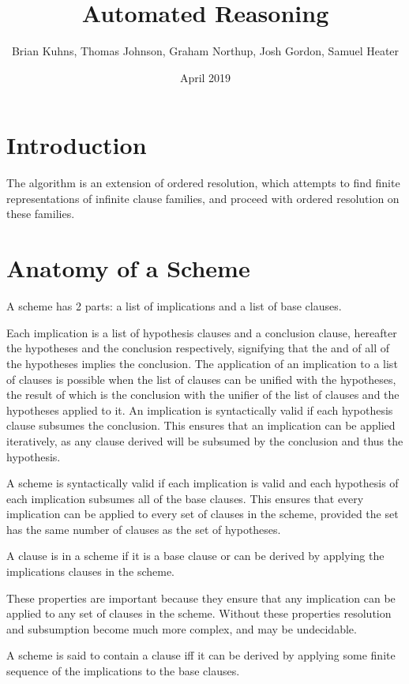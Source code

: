 \documentclass{article}
\title{Automated Reasoning}
\author{
    Brian Kuhns,
    Thomas Johnson,
    Graham Northup,
    Josh Gordon,
    Samuel Heater
  } %
\date{April 2019}
\begin{document}
\maketitle

\section{Introduction}

The algorithm is an extension of ordered resolution,
which attempts to find finite representations of infinite clause families,
and proceed with ordered resolution on these families.

\section{Anatomy of a Scheme}

A scheme has 2 parts:
a list of implications and a list of base clauses.

Each implication is a list of hypothesis clauses and a conclusion clause, hereafter the hypotheses and the conclusion respectively,
signifying that the and of all of the hypotheses implies the conclusion.
The application of an implication to a list of clauses is possible when the list of clauses can be unified with the hypotheses,
the result of which is the conclusion with the unifier of the list of clauses and the hypotheses applied to it.
An implication is syntactically valid if each hypothesis clause subsumes the conclusion.
This ensures that an implication can be applied iteratively, as any clause derived will be subsumed by the conclusion and thus the hypothesis.


A scheme is syntactically valid if each implication is valid and
each hypothesis of each implication subsumes all of the base clauses.
This ensures that every implication can be applied to every set of clauses in the scheme,
provided the set has the same number of clauses as the set of hypotheses.

A clause is in a scheme if it is a base clause or can be derived by applying the implications clauses in the scheme.

These properties are important because they ensure that any implication can be applied to any set of clauses in the scheme.
Without these properties resolution and subsumption become much more complex, and may be undecidable.

A scheme is said to contain a clause iff it can be derived by applying some finite sequence of the 
implications to the base clauses.
\end{document}
